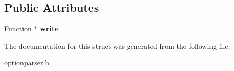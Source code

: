 \subsection*{Public Attributes}
\begin{DoxyCompactItemize}
\item 
\mbox{\label{structoption_1_1_print_usage_implementation_1_1_function_writer_a3442e05eb04d2b1ee321193f5b10557b}} 
Function $\ast$ {\bfseries write}
\end{DoxyCompactItemize}


The documentation for this struct was generated from the following file\+:\begin{DoxyCompactItemize}
\item 
\hyperlink{optionparser_8h}{optionparser.\+h}\end{DoxyCompactItemize}
